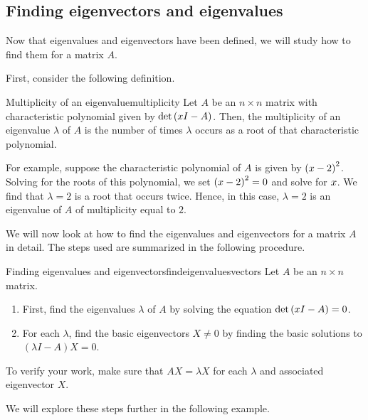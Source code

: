 \subsection{Finding eigenvectors and eigenvalues}

Now that eigenvalues and eigenvectors have been defined, we will study how to find
 them for a matrix $A$. 

First, consider the following definition.

\begin{definition}{Multiplicity of an eigenvalue}{multiplicity}
Let $A$ be an $n \times n$ matrix with characteristic polynomial given by 
$\det \left( x I -  A\right)$. Then, the multiplicity of an eigenvalue $\lambda$ of $A$
is the number of times $\lambda$ occurs as a root of that characteristic polynomial.
\end{definition}

For example, suppose the characteristic polynomial of $A$ is given by
$\left( x - 2 \right)^2$. Solving for the roots of this
polynomial, we set $\left( x - 2 \right)^2 = 0$ and solve for
$x$.  We find that $\lambda = 2$ is a root that occurs
twice. Hence, in this case, $\lambda = 2$ is an eigenvalue of $A$ of
multiplicity equal to $2$.

We will now look at how to find the eigenvalues and eigenvectors for a
matrix $A$ in detail.  The steps used are summarized in the following
procedure.

\begin{procedure}{Finding eigenvalues and eigenvectors}{findeigenvaluesvectors}
%
Let $A$ be an $n \times n$ matrix. 
\begin{enumerate}
\item First, find the eigenvalues $\lambda$ of $A$ by solving the equation $\det \left( x I -A \right) = 0$. 

\item For each $\lambda$, find the basic eigenvectors $X \neq 0$ by finding the basic solutions to  $\left( \lambda I - A \right) X = 0$.
\end{enumerate}

To verify your work, make sure that $AX=\lambda X$
for each $\lambda$ and associated eigenvector $X$.
\end{procedure}

We will explore these steps further in the following example.

